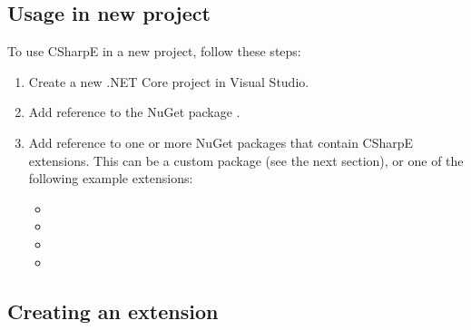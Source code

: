 
\subsection{Usage in new project}

To use CSharpE in a new project, follow these steps:

\begin{enumerate}
\item Create a new .NET Core project in Visual Studio.


\item Add reference to the NuGet package .

\item Add reference to one or more NuGet packages that contain CSharpE extensions. This can be a custom package (see the next section), or one of the following example extensions:

\begin{itemize}
\item {}
\item {}
\item {}
\item {}
\end{itemize}
\end{enumerate}

\subsection{Creating an extension}

